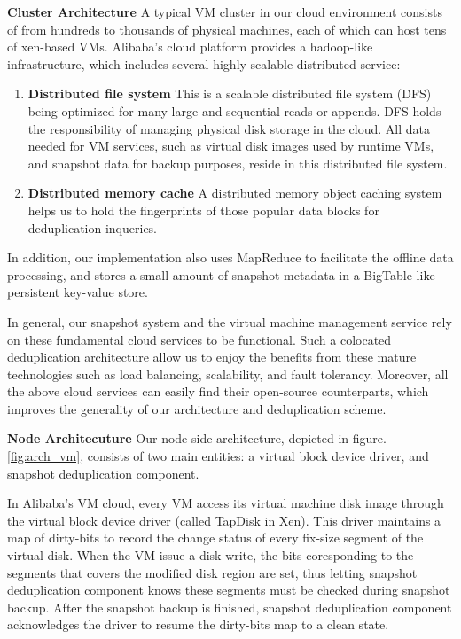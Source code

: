 {\bf Cluster Architecture}
A typical VM cluster in our cloud environment
consists of from hundreds to thousands of physical machines, each of which can
host tens of xen-based\cite{Barham2003} VMs.
Alibaba's cloud platform provides a hadoop-like infrastructure, 
which includes several highly scalable distributed service:
\begin{enumerate}
\item {\bf Distributed file system} This is a scalable distributed file system (DFS) being optimized for many large and sequential reads or appends. DFS holds the responsibility of managing physical disk storage
in the cloud. All data needed for VM services, such as virtual disk images used by runtime VMs,
and snapshot data for backup purposes, reside in this distributed file system. 
\item {\bf Distributed memory cache} A distributed memory object caching system helps us to hold the fingerprints of those popular data blocks for deduplication inqueries. 
\end{enumerate}
In addition, our implementation also uses MapReduce to facilitate the offline
data processing, and stores a small amount of snapshot metadata in a 
BigTable-like persistent key-value store. 

In general, our snapshot system and the virtual machine management service 
rely on these fundamental cloud services
to be functional. Such a colocated deduplication architecture allow us 
to enjoy the benefits from these mature technologies 
such as load balancing, scalability, and fault tolerancy.
Moreover, all the above cloud services can easily find their open-source counterparts,
which improves the generality of our architecture and deduplication scheme.

{\bf Node Architecuture} 
Our node-side architecture, depicted in figure.\ref{fig:arch_vm}, consists of
two main entities: a virtual block device driver, and snapshot deduplication component.

In Alibaba's VM cloud, every VM access its virtual machine disk image through the
virtual block device driver (called TapDisk\cite{Warfield2005} in Xen).
This driver maintains a map of dirty-bits to record
the change status of every fix-size segment of the virtual disk. 
When the VM issue a disk write, the bits coresponding to the segments that covers 
the modified disk region are set, thus letting snapshot deduplication component knows these
segments must be checked during snapshot backup. After the snapshot backup is finished, 
snapshot deduplication component acknowledges the driver to resume the dirty-bits map to
a clean state.

